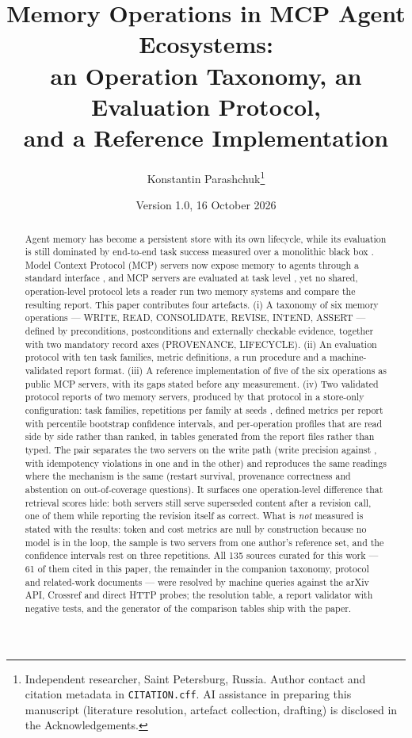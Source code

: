 \documentclass[11pt,a4paper]{article}
\title{\bf Memory Operations in MCP Agent Ecosystems:\\ an Operation Taxonomy, an Evaluation Protocol,\\ and a Reference Implementation}
\author{Konstantin Parashchuk\thanks{Independent researcher, Saint Petersburg, Russia.
Author contact and citation metadata in \texttt{CITATION.cff}. AI assistance in preparing this
manuscript (literature resolution, artefact collection, drafting) is disclosed in the
Acknowledgements.}}
\date{Version 1.0, 16 October 2026}
\begin{document}
\maketitle

\begin{abstract}
Agent memory has become a persistent store with its own lifecycle, while its evaluation is
still dominated by end-to-end task success measured over a monolithic black box
\cite{zhou2026agentnative,huan2026secondhalf}. Model Context Protocol (MCP) servers now expose
memory to agents through a standard interface \cite{mcpintro,mcpspec2025}, and MCP servers are
evaluated at task level \cite{luo2025mcpbench,luo2025mcpuniverse}, yet no shared,
operation-level protocol lets a reader run two memory systems and compare the resulting
report. This paper contributes four artefacts. (i) A taxonomy of six memory operations ---
WRITE, READ, CONSOLIDATE, REVISE, INTEND, ASSERT --- defined by preconditions, postconditions
and externally checkable evidence, together with two mandatory record axes (PROVENANCE,
LIFECYCLE). (ii) An evaluation protocol with ten task families, metric definitions, a run
procedure and a machine-validated report format. (iii) A reference implementation of five of
the six operations as public MCP servers, with its gaps stated before any measurement. (iv) Two
validated protocol reports of two memory servers, produced by that protocol in a store-only
configuration:  task families,  repetitions per family at
seeds ,  defined metrics per report with percentile
bootstrap confidence intervals, and per-operation profiles that are read side by side rather
than ranked, in tables generated from the report files rather than typed. The pair separates the
two servers on the write path (write precision  against
, with  idempotency
violations in one and  in the other) and reproduces the
same readings where the mechanism is the same (restart survival, provenance correctness and
abstention on out-of-coverage questions). It surfaces one operation-level difference that
retrieval scores hide: both servers still serve superseded content after a revision call, one of
them while reporting the revision itself as correct. What is \emph{not} measured is stated with
the results: token and cost metrics are null by construction because no model is in the loop, the
sample is two servers from one author's reference set, and the confidence intervals rest on three
repetitions. All 135 sources curated for this work --- 61 of them cited in this paper, the
remainder in the companion taxonomy, protocol and related-work documents --- were resolved by
machine queries against the arXiv API, Crossref and direct HTTP probes; the resolution table, a
report validator with negative tests, and the generator of the comparison tables ship with the
paper.
\end{abstract}
\end{document}
